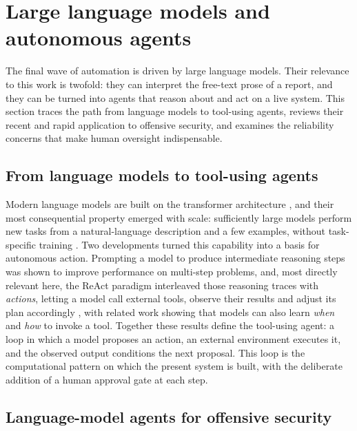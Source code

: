 \section{Large language models and autonomous agents}
\label{sec:llm-agents}

The final wave of automation is driven by large language models. Their relevance
to this work is twofold: they can interpret the free-text prose of a report, and
they can be turned into agents that reason about and act on a live system. This
section traces the path from language models to tool-using agents, reviews their
recent and rapid application to offensive security, and examines the reliability
concerns that make human oversight indispensable.

\subsection{From language models to tool-using agents}
\label{subsec:llm-foundations}

Modern language models are built on the transformer architecture \cite{vaswani2017},
and their most consequential property emerged with scale: sufficiently large models
perform new tasks from a natural-language description and a few examples, without
task-specific training \cite{brown2020}. Two developments turned this capability
into a basis for autonomous action. Prompting a model to produce intermediate
reasoning steps was shown to improve performance on multi-step problems, and, most
directly relevant here, the ReAct paradigm interleaved those reasoning traces with
\emph{actions}, letting a model call external tools, observe their results and
adjust its plan accordingly \cite{yao2023react}, with related work showing that
models can also learn \emph{when} and \emph{how} to invoke a tool. Together these results define the tool-using agent: a
loop in which a model proposes an action, an external environment executes it, and
the observed output conditions the next proposal. This loop is the computational
pattern on which the present system is built, with the deliberate addition of a
human approval gate at each step.

\subsection{Language-model agents for offensive security}
\label{subsec:llm-offensive}

